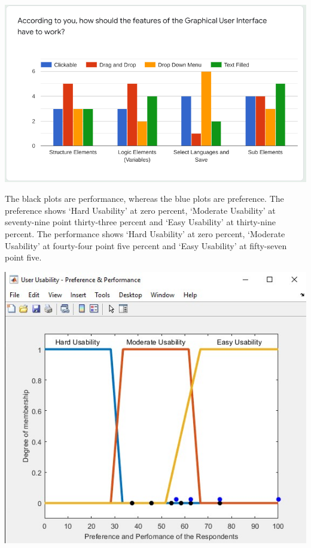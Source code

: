 \documentclass[a0,portrait]{a0poster}
\begin{document}
\begin{multicols}{2}
\begin{center}\vspace{1cm}
\includegraphics[width=0.55\linewidth]{../../Showcase-Work_Completed/Surveying/q11.png}
\label{fig:q-11}
\end{center}\vspace{1cm}

The black plots are performance, whereas the blue plots are preference. The preference shows `Hard Usability' at zero percent, `Moderate Usability' at seventy-nine point thirty-three percent and `Easy Usability' at thirty-nine percent. The performance shows `Hard Usability' at zero percent, `Moderate Usability' at fourty-four point five percent and `Easy Usability' at fifty-seven point five.

\begin{center}\vspace{1cm}
    \includegraphics[width=0.45\linewidth]{FuzzyLogicPrefPerf.jpg}
    \label{fig:fuzzyLogicPrefPerf}
\end{center}\vspace{1cm}


\end{multicols}
\end{document}
